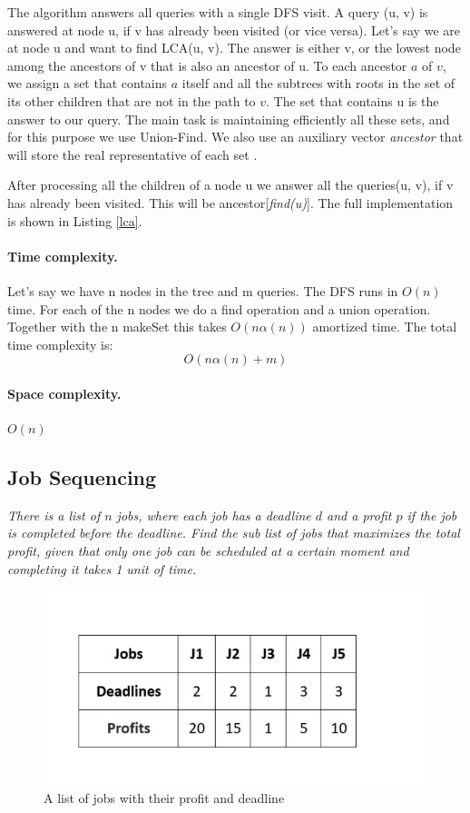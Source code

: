 \documentclass{article}
\begin{document}
 \medskip
 The algorithm answers all queries
 with a single DFS visit. A query (u, v) is answered at node u, if v has already been visited
 (or vice versa). Let's say we are at node u and want to find LCA(u, v). The answer is either v, or the lowest node among
the ancestors of v that is also an ancestor of u. To each ancestor $a$  of $v$, we assign a set
that contains $a$ itself and all the subtrees with roots in the set of its other children
that are not in the path to $v$. The set that contains u is the answer to our query. The main task is maintaining
efficiently all these sets, and for this purpose we use Union-Find. We also use an auxiliary vector \emph{ancestor} that
will store the real representative of each set \cite{cp}.

After processing all the children of a node u we answer all the
queries(u, v), if v has already been visited. This will be ancestor[\emph{find(u)}]. The full implementation
is shown in Listing \ref{lca}.

\paragraph{Time complexity.} Let's say we have n nodes in the tree and m queries.
The DFS runs in $O(n)$ time. For each of the n nodes we do a find operation and a union operation. Together
with the n makeSet this takes $O(n\alpha(n))$ amortized time.
The total time complexity is: 
$$O(n\alpha(n) + m)$$

\paragraph{Space complexity.} $O(n)$


\subsection{Job Sequencing}
\emph{There is a list of $n$ jobs, where each job has a deadline $d$ and a profit $p$ if the job
is completed before the deadline. Find the sub list of jobs that maximizes the total profit, given
that only one job can be scheduled at a certain moment and completing it takes 1 unit of time.}
\begin{figure}[h!]
    \centering
    \includegraphics[scale=0.5]{img/jobs.jpeg}
    \caption{A list of jobs with their profit and deadline}
\end{figure}
\end{document}
